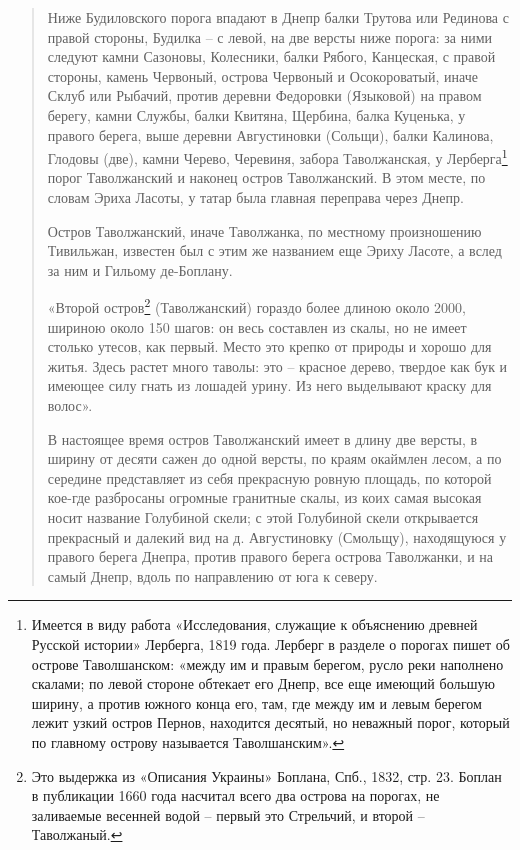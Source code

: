 \begin{quotation}
Ниже Будиловского порога впадают в Днепр балки Трутова или Рединова с правой стороны, Будилка – с левой, на две версты ниже порога: за ними следуют камни Сазоновы, Колесники, балки Рябого, Канцеская, с правой стороны, камень Червоный, острова Червоный и Осокороватый, иначе Склуб или Рыбачий, против деревни Федоровки (Языковой) на правом берегу, камни Службы, балки Квитяна, Щербина, балка Куценька, у правого берега, выше деревни Августиновки (Сольщи), балки Калинова, Глодовы (две), камни Черево, Черевиня, забора Таволжанская, у Лерберга\footnote{Имеется в виду работа «Исследования, служащие к объяснению древней Русской истории» Лерберга, 1819 года. Лерберг в разделе о порогах пишет об острове Таволшанском: «между им и правым берегом, русло реки наполнено скалами; по левой стороне обтекает его Днепр, все еще имеющий большую ширину, а против южного конца его, там, где между им и левым берегом лежит узкий остров Пернов, находится десятый, но неважный порог, который по главному острову называется Таволшанским».} порог Таволжанский и наконец остров Таволжанский. В этом месте, по словам Эриха Ласоты, у татар была главная переправа через Днепр.

Остров Таволжанский, иначе Таволжанка, по местному произношению Тивильжан, известен был с этим же названием еще Эриху Ласоте, а вслед за ним и Гильому де-Боплану. 

«Второй остров\footnote {Это выдержка из «Описания Украины» Боплана, Спб., 1832, стр. 23. Боплан в публикации 1660 года насчитал всего два острова на порогах, не заливаемые весенней водой – первый это Стрельчий, и второй – Таволжаный.} (Таволжанский) гораздо более длиною около 2000, шириною около 150 шагов: он весь составлен из скалы, но не имеет столько утесов, как первый. Место это крепко от природы и хорошо для житья. Здесь растет много таволы: это – красное дерево, твердое как бук и имеющее силу гнать из лошадей урину. Из него выделывают краску для волос».

В настоящее время остров Таволжанский имеет в длину две версты, в ширину от десяти сажен до одной версты, по краям окаймлен лесом, а по середине представляет из себя прекрасную ровную площадь, по которой кое-где разбросаны огромные гранитные скалы, из коих самая высокая носит название Голубиной скели; с этой Голубиной скели открывается прекрасный и далекий вид на д. Августиновку (Смольщу), находящуюся у правого берега Днепра, против правого берега острова Таволжанки, и на самый Днепр, вдоль по направлению от юга к северу.


\end{quotation}
